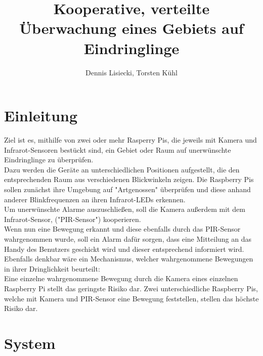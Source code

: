 \documentclass[journal]{IEEEtran}
\title{Kooperative, verteilte Überwachung eines Gebiets auf Eindringlinge}		%
\author{Dennis Lisiecki, Torsten Kühl}								%
\begin{document}

\maketitle	%




\section{Einleitung}
Ziel ist es, mithilfe von zwei oder mehr Rasperry Pis, die jeweils mit Kamera und Infrarot-Sensoren bestückt sind, ein Gebiet oder Raum auf unerwünschte Eindringlinge zu überprüfen.\\
Dazu werden die Geräte an unterschiedlichen Positionen aufgestellt, die den entsprechenden Raum aus verschiedenen Blickwinkeln zeigen. 
Die Raspberry Pis sollen zunächst ihre Umgebung auf "Artgenossen" überprüfen und diese anhand anderer Blinkfrequenzen an ihren Infrarot-LEDs erkennen. \\
Um unerwünschte Alarme auszuschließen, soll die Kamera außerdem mit dem Infrarot-Sensor, ("PIR-Sensor") kooperieren. \\
Wenn nun eine Bewegung erkannt und diese ebenfalls durch das PIR-Sensor wahrgenommen wurde, soll ein Alarm dafür sorgen, dass eine Mitteilung an das Handy des Benutzers geschickt wird und dieser entsprechend informiert wird.\\
Ebenfalls denkbar wäre ein Mechanismus, welcher wahrgenommene Bewegungen in ihrer Dringlichkeit beurteilt:\\
Eine einzelne wahrgenommene Bewegung durch die Kamera eines einzelnen Raspberry Pi stellt das geringste Risiko dar.
Zwei unterschiedliche Raspberry Pis, welche mit Kamera und PIR-Sensor eine Bewegung feststellen, stellen das höchste Risiko dar.




\section{System}
\end{document}
